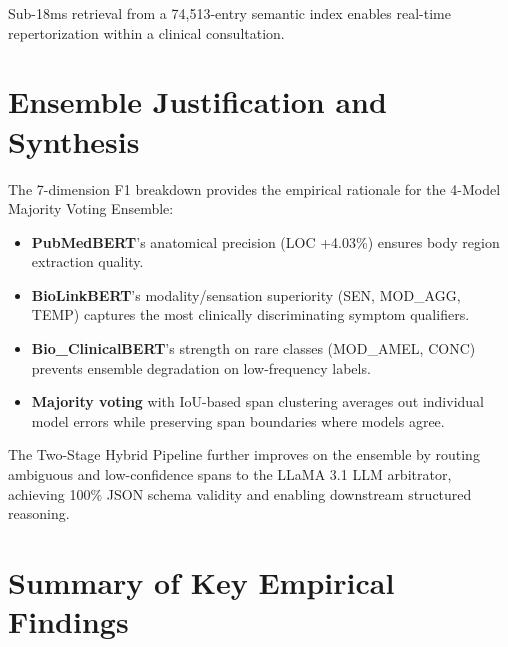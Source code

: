 Sub-18ms retrieval from a 74,513-entry semantic index enables real-time repertorization within a clinical consultation.


\section{Ensemble Justification and Synthesis}

The 7-dimension F1 breakdown provides the empirical rationale for the 4-Model Majority Voting Ensemble:

\begin{itemize}
  \item \textbf{PubMedBERT}'s anatomical precision (LOC +4.03\%) ensures body region extraction quality.
  \item \textbf{BioLinkBERT}'s modality/sensation superiority (SEN, MOD\_AGG, TEMP) captures the most clinically discriminating symptom qualifiers.
  \item \textbf{Bio\_ClinicalBERT}'s strength on rare classes (MOD\_AMEL, CONC) prevents ensemble degradation on low-frequency labels.
  \item \textbf{Majority voting} with IoU-based span clustering averages out individual model errors while preserving span boundaries where models agree.
\end{itemize}

The Two-Stage Hybrid Pipeline further improves on the ensemble by routing ambiguous and low-confidence spans to the LLaMA 3.1 LLM arbitrator, achieving 100\% JSON schema validity and enabling downstream structured reasoning.


\section{Summary of Key Empirical Findings}

